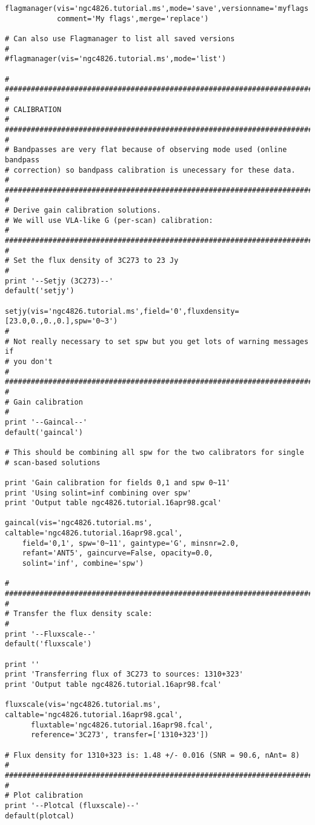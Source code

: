 \begin{verbatim}
flagmanager(vis='ngc4826.tutorial.ms',mode='save',versionname='myflags',
            comment='My flags',merge='replace')

# Can also use Flagmanager to list all saved versions
#
#flagmanager(vis='ngc4826.tutorial.ms',mode='list')

#
##########################################################################
#
# CALIBRATION
#
##########################################################################
#
# Bandpasses are very flat because of observing mode used (online bandpass
# correction) so bandpass calibration is unecessary for these data.
#
##########################################################################
#
# Derive gain calibration solutions.
# We will use VLA-like G (per-scan) calibration:
#
##########################################################################
#
# Set the flux density of 3C273 to 23 Jy
#
print '--Setjy (3C273)--'
default('setjy')

setjy(vis='ngc4826.tutorial.ms',field='0',fluxdensity=[23.0,0.,0.,0.],spw='0~3')
#
# Not really necessary to set spw but you get lots of warning messages if
# you don't
#
##########################################################################
#
# Gain calibration
#
print '--Gaincal--'
default('gaincal')

# This should be combining all spw for the two calibrators for single
# scan-based solutions

print 'Gain calibration for fields 0,1 and spw 0~11'
print 'Using solint=inf combining over spw'
print 'Output table ngc4826.tutorial.16apr98.gcal'

gaincal(vis='ngc4826.tutorial.ms', caltable='ngc4826.tutorial.16apr98.gcal',
	field='0,1', spw='0~11', gaintype='G', minsnr=2.0,
	refant='ANT5', gaincurve=False, opacity=0.0,
	solint='inf', combine='spw')

#
##########################################################################
#
# Transfer the flux density scale:
#
print '--Fluxscale--'
default('fluxscale')

print ''
print 'Transferring flux of 3C273 to sources: 1310+323'
print 'Output table ngc4826.tutorial.16apr98.fcal'

fluxscale(vis='ngc4826.tutorial.ms', caltable='ngc4826.tutorial.16apr98.gcal',
	  fluxtable='ngc4826.tutorial.16apr98.fcal',
	  reference='3C273', transfer=['1310+323'])

# Flux density for 1310+323 is: 1.48 +/- 0.016 (SNR = 90.6, nAnt= 8)
#
##########################################################################
#
# Plot calibration
print '--Plotcal (fluxscale)--'
default(plotcal)


\end{verbatim}

